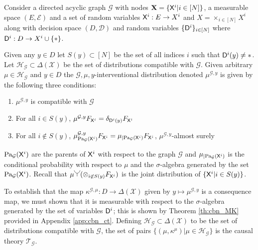 \begin{definition}\label{def:CBN}

Consider a directed acyclic graph $\mathcal{G}$ with nodes $\mathbf{X}=\{\mathsf{X}^i|i\in [N]\}$, a measurable space $(E,\mathcal{E})$ and a set of random variables $\mathsf{X}^i:E\to X^i$ and $X=\times_{i\in[N]} X^i$ along with decision space $(D,\mathcal{D})$ and random variables $\{\mathsf{D}^i\}_{i\in [N]}$ where $\mathsf{D}^i:D\to X^i\cup\{*\}$.

Given any $y\in D$ let $S(y)\subset[N]$ be the set of all indices $i$ such that $\mathsf{D}^i(y)\neq *$. Let $\mathscr{H}_\mathcal{G}\subset\Delta(\mathcal{X})$ be the set of distributions compatible with $\mathcal{G}$. Given arbitrary $\mu\in \mathscr{H}_\mathcal{G}$ and $y\in D$ the $\mathcal{G},\mu,y$-interventional distribution denoted $\mu^{\mathcal{G},y}$ is given by the following three conditions:
\begin{enumerate}
    \item $\mu^{\mathcal{G},y}$ is compatible with $\mathcal{G}$
    \item For all $i\in S(y)$, $\mu^{\mathcal{G},y}F_{\mathsf{X}^i}=\delta_{\mathsf{D}^i(y)} F_{\mathsf{X}^i}$
    \item For all $i\not \in S(y)$, $\mu^{\mathcal{G},y}_{\text{Pa}_{\mathcal{G}}(\mathsf{X}^i)} F_{\mathsf{X}^i}=\mu_{|\text{Pa}_{\mathcal{G}}(\mathsf{X}^i)}F_{\mathsf{X}^i} $, $\mu^{\mathcal{G},y}$-almost surely
\end{enumerate}
\end{definition}

$\text{Pa}_{\mathcal{G}}(\mathsf{X}^i)$ are the parents of $\mathsf{X}^i$ with respect to the graph $\mathcal{G}$ and $\mu_{|\text{Pa}_{\mathcal{G}}(\mathsf{X}^i)}$ is the conditional probability with respect to $\mu$ and the $\sigma$-algebra generated by the set $\text{Pa}_{\mathcal{G}}(\mathsf{X}^i)$. Recall that $\mu \splitter{0.15}(\otimes_{i\not\in S(y)} F_{\RV{X}^i})$ is the joint distribution of $\{\mathsf{X}^i|i\in S(y)\}$.

To establish that the map $\kappa^{\mathcal{G},\mu}:D\to \Delta(\mathcal{X})$ given by $y\mapsto \mu^{\mathcal{G},y}$ is a consequence map, we must shown that it is measurable with respect to the $\sigma$-algebra generated by the set of variables $\mathsf{D}^i$; this is shown by Theorem \ref{th:cbn_MK} provided in Appendix \ref{app:cbn_ct}. Defining $\mathscr{H}_{\mathcal{G}}\subset\Delta(\mathcal{X})$ to be the set of distributions compatible with $\mathcal{G}$, the set of pairs $\{(\mu, \kappa^\mu)|\mu\in \mathscr{H}_{\mathcal{G}}\}$ is the causal theory $\mathscr{T}_\mathcal{G}$.

